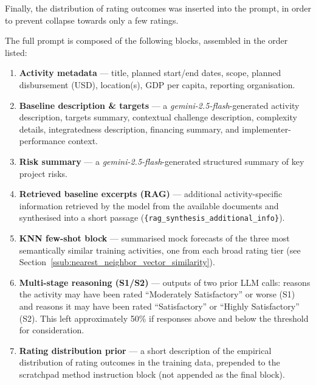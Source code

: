 
Finally, the distribution of rating outcomes was inserted into the prompt, in order to prevent collapse towards only a few ratings.


The full prompt is composed of the following blocks, assembled in the order listed:

\begin{enumerate}[noitemsep,topsep=2pt]
  \item \textbf{Activity metadata} --- title, planned start/end dates, scope, planned disbursement (USD), location(s), GDP per capita, reporting organisation.
  \item \textbf{Baseline description \& targets} --- a \emph{gemini-2.5-flash}-generated activity description, targets summary, contextual challenge description, complexity details, integratedness description, financing summary, and implementer-performance context.
  \item \textbf{Risk summary} --- a \emph{gemini-2.5-flash}-generated structured summary of key project risks.
  \item \textbf{Retrieved baseline excerpts (RAG)} --- additional activity-specific information retrieved by the model from the available documents and synthesised into a short passage (\texttt{\{rag\_synthesis\_additional\_info\}}).
  \item \textbf{KNN few-shot block} --- summarised mock forecasts of the three most semantically similar training activities, one from each broad rating tier (see Section~\ref{ssub:nearest_neighbor_vector_similarity}).
  \item \textbf{Multi-stage reasoning (S1/S2)} --- outputs of two prior LLM calls: reasons the activity may have been rated ``Moderately Satisfactory'' or worse (S1) and reasons it may have been rated ``Satisfactory'' or ``Highly Satisfactory'' (S2). This left approximately 50\% if responses above and below the threshold for consideration.
  \item \textbf{Rating distribution prior} --- a short description of the empirical distribution of rating outcomes in the training data, prepended to the scratchpad method instruction block (not appended as the final block).
\end{enumerate}

